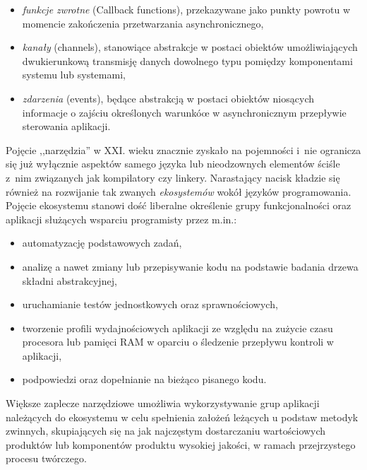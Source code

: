 {\begin{itemize}
  \begin{itemize}
    \item \emph{funkcje zwrotne} (Callback functions), przekazywane jako punkty powrotu w momencie zakończenia przetwarzania asynchronicznego,
    \item \emph{kanały} (channels), stanowiące abstrakcje w postaci obiektów umożliwiających dwukierunkową transmisję danych dowolnego typu pomiędzy komponentami systemu lub systemami,
    \item \emph{zdarzenia} (events), będące abstrakcją w postaci obiektów niosących informacje o zajściu określonych warunkóœ w asynchronicznym przepływie sterowania aplikacji.
  \end{itemize}
\end{itemize}
}

\par{
  Pojęcie ,,narzędzia'' w XXI. wieku znacznie zyskało na pojemności i~nie ogranicza się już wyłącznie aspektów samego języka lub nieodzownych elementów ściśle z~nim związanych jak kompilatory czy linkery.
  Narastający nacisk kładzie się również na rozwijanie tak zwanych \emph{ekosystemów} wokół języków programowania.
  Pojęcie ekosystemu stanowi dość liberalne określenie grupy funkcjonalności oraz aplikacji służących wsparciu programisty przez m.in.:
  \begin{itemize}
    \item automatyzację podstawowych zadań,
    \item analizę a nawet zmiany lub przepisywanie kodu na podstawie badania drzewa składni abstrakcyjnej,
    \item uruchamianie testów jednostkowych oraz sprawnościowych,
    \item tworzenie profili wydajnościowych aplikacji ze względu na zużycie czasu procesora lub pamięci RAM w oparciu o śledzenie przepływu kontroli w aplikacji,
    \item podpowiedzi oraz dopełnianie na bieżąco pisanego kodu.
  \end{itemize}
}

\par{
  Większe zaplecze narzędziowe umożliwia wykorzystywanie grup aplikacji należących do ekosystemu w celu spełnienia założeń leżących u podstaw metodyk zwinnych, skupiających się na jak najczęstym dostarczaniu wartościowych produktów lub komponentów produktu wysokiej jakości, w ramach przejrzystego procesu twórczego.
}




